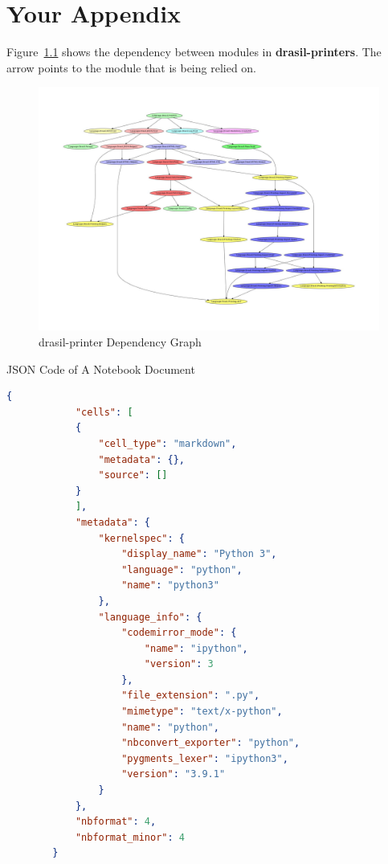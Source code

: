 \chapter{Your Appendix}
\label{appendix_a}

Figure~\ref{fig:drasil_printer} shows the dependency between modules in 
\textbf{drasil-printers}. The arrow points to the module that is being relied 
on. 
\begin{figure}
	\includegraphics{figures/drasil-printers.jpg}
	\caption{drasil-printer Dependency Graph}
	\label{fig:drasil_printer}
\end{figure}

\begin{listing}[h]
	\caption{JSON Code of A Notebook Document}
	\label{code:notebookmetada}
	\begin{lstlisting}[language=json] 
		{
			"cells": [
			{
				"cell_type": "markdown",
				"metadata": {},
				"source": []
			}
			],
			"metadata": {
				"kernelspec": {
					"display_name": "Python 3",
					"language": "python",
					"name": "python3"
				},
				"language_info": {
					"codemirror_mode": {
						"name": "ipython",
						"version": 3
					},
					"file_extension": ".py",
					"mimetype": "text/x-python",
					"name": "python",
					"nbconvert_exporter": "python",
					"pygments_lexer": "ipython3",
					"version": "3.9.1"
				}
			},
			"nbformat": 4,
			"nbformat_minor": 4
		}	
	\end{lstlisting}
\end{listing}
